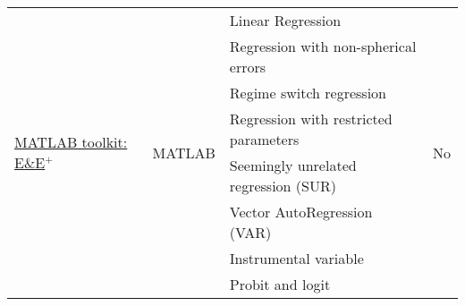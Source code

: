 \begin{table}[!ht]
{{\begin{tabular}{|l|l|l|c|}
\multirow{13}{*}{\href{https://la.mathworks.com/matlabcentral/fileexchange/32601-toolkit-on-econometrics-and-economics-teaching}{MATLAB toolkit: E\&E$^{+}$}} & \multirow{13}{*}{MATLAB}                     & Linear Regression                                                            & \multirow{13}{*}{No}                               \\
                                                                 &                                              & Regression with non-spherical errors                          &                                                                     \\
                                                                 &                                              & Regime switch regression                                                     &                                                                     \\
                                                                 &                                              & Regression with restricted parameters                                        &                                                                     \\
                                                                 &                                              & Seemingly unrelated regression (SUR)                                         &                                                                     \\
                                                                 &                                              & Vector AutoRegression (VAR)                                                  &                                                                     \\
                                                                 &                                              & Instrumental variable                                        &                                                                     \\
                                                                 &                                              & Probit and logit                                                      &                                                                     \\

\end{tabular}}}
\end{table}
